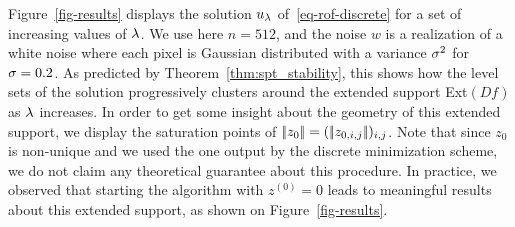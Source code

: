 Figure~\ref{fig-results} displays the solution $u_{\lambda}$ of~\eqref{eq-rof-discrete} for a set of increasing values of $\lambda$. We use here $n=512$, and the noise $w$ is a realization of a white noise where each pixel is Gaussian distributed with a variance $\sigma^2$ for $\sigma=0.2$.
%
As predicted by Theorem~\ref{thm:spt_stability}, this shows how the level sets of the solution progressively clusters around the extended support Ext$(Df)$ as $\lambda$ increases. In order to get some insight about the geometry of this extended support, we display the saturation points of $|\!| z_{0} |\!| = (|\!| z_{0,i,j} |\!|)_{i,j}$. Note that since $z_0$ is non-unique and we used the one output by the discrete minimization scheme, we do not claim any theoretical guarantee about this procedure. In practice, we observed that starting the algorithm with $z^{(0)}=0$ leads to meaningful results about this extended support, as shown on Figure~\ref{fig-results}.


\newcommand{\myfig}[1]{\texttt{[image: figures/\#1]}}
\newcommand{\figRow}[4]{%
\myfig{#1/original.png}&%
\myfig{#1/noisy-img}&%
\myfig{#1/extended-support.png}&%
\myfig{#1/tv-noisy-#2-ls.png}&%
\myfig{#1/tv-noisy-#3-ls.png}&%
\myfig{#1/tv-noisy-#4-ls.png}\\}

